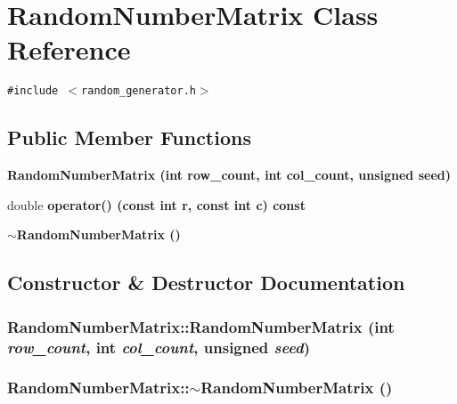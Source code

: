 \section{Random\-Number\-Matrix Class Reference}
\label{classRandomNumberMatrix}
{\tt \#include $<$random\_\-generator.h$>$}

\subsection*{Public Member Functions}
\begin{CompactItemize}
\item 
\bf{Random\-Number\-Matrix} (int row\_\-count, int col\_\-count, unsigned seed)
\item 
double \bf{operator()} (const int r, const int c) const 
\item 
\bf{$\sim$Random\-Number\-Matrix} ()
\end{CompactItemize}


\subsection{Constructor \& Destructor Documentation}
\subsubsection{\setlength{\rightskip}{0pt plus 5cm}Random\-Number\-Matrix::Random\-Number\-Matrix (int {\em row\_\-count}, int {\em col\_\-count}, unsigned {\em seed})\hspace{0.3cm}{\tt  [inline]}}\label{classRandomNumberMatrix_2722bf7a5c538f76e5651d2a019f58c3}


\subsubsection{\setlength{\rightskip}{0pt plus 5cm}Random\-Number\-Matrix::$\sim$Random\-Number\-Matrix ()\hspace{0.3cm}{\tt  [inline]}}\label{classRandomNumberMatrix_9beb5d99b8dce978ecb8af384bf7003e}




